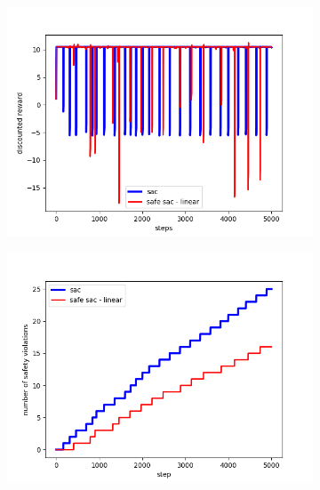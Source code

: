 \documentclass{article} %
\begin{document}
\begin{figure}[ht]
\centering
\begin{subfigure}[b]{0.45\textwidth}
\centering
\includegraphics[width=\textwidth]{fig7a_l_reward.png}
\caption{}
\label{fig:gull}
\end{subfigure}%
\begin{subfigure}[b]{0.45\textwidth}
\centering
\includegraphics[width=\textwidth]{fig7b_l_vio.png}
\caption{}
\label{fig:gull}
\end{subfigure}%


\end{figure}
\end{document}

